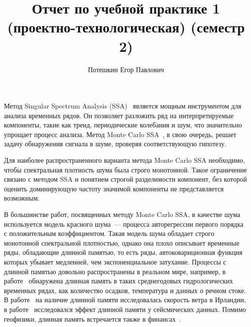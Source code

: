 \documentclass[specialist,
substylefile = spbu_report.rtx,
subf,href,colorlinks=true, 12pt]{disser}
\theoremstyle{definition}
\begin{document}
%
%

\title{Отчет по учебной практике 1 (проектно-технологическая) (семестр 2)}


\author{Потешкин Егор Павлович}


\date{\number\year}

\maketitle

\tableofcontents

\intro
Метод Singular Spectrum Analysis (SSA)~\cite{Broomhead1986,Golyandina2001} является мощным инструментом для анализа временных рядов. Он позволяет разложить ряд на интерпретируемые компоненты, такие как тренд, периодические колебания и шум, что значительно упрощает процесс анализа. Метод Monte Carlo SSA~\cite{Allen1996}, в свою очередь, решает задачу обнаружения сигнала в шуме, проверяя соответствующую гипотезу.

Для наиболее распространенного варианта метода Monte Carlo SSA необходимо, чтобы спектральная плотность шума была строго монотонной. Такое ограничение связано с методом SSA и понятием строгой разделимости компонент, без которой оценить доминирующую частоту значимой компоненты не представляется возможным.

В большинстве работ, посвященных методу Monte Carlo SSA, в качестве шума используется модель красного шума~--- процесса авторегрессии первого порядка с положительным коэффициентом. Такая модель шума обладает строго монотонной спектральной плотностью, однако она плохо описывает временные ряды, обладающие длинной памятью, то есть ряды, автоковариционная функция которых убывает медленней, чем экспоненциальное затухание. Процессы с длинной памятью довольно распространены в реальном мире, например, в работе~\cite{Hipel1994} обнаружена длинная память в таких среднегодовых гидрологических временных рядах, как количество осадков, температура и данных о речном стоке. В работе~\cite{Haslett1989} на наличие длинной памяти исследовалась скорость ветра в Ирландии, в работе~\cite{Mariani2020} исследовался эффект длинной памяти у сейсмических данных. Помимо геофизики, длинная память встречается также в финансах~\cite{Barkoulas1997,Guglielmo2019}.
\end{document}
